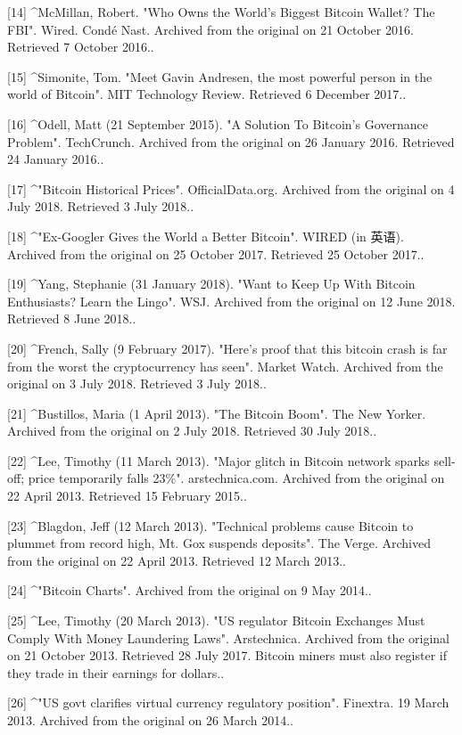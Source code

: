 [14]
^McMillan, Robert. "Who Owns the World's Biggest Bitcoin Wallet? The FBI". Wired. Condé Nast. Archived from the original on 21 October 2016. Retrieved 7 October 2016..

[15]
^Simonite, Tom. "Meet Gavin Andresen, the most powerful person in the world of Bitcoin". MIT Technology Review. Retrieved 6 December 2017..

[16]
^Odell, Matt (21 September 2015). "A Solution To Bitcoin's Governance Problem". TechCrunch. Archived from the original on 26 January 2016. Retrieved 24 January 2016..

[17]
^"Bitcoin Historical Prices". OfficialData.org. Archived from the original on 4 July 2018. Retrieved 3 July 2018..

[18]
^"Ex-Googler Gives the World a Better Bitcoin". WIRED (in 英语). Archived from the original on 25 October 2017. Retrieved 25 October 2017..

[19]
^Yang, Stephanie (31 January 2018). "Want to Keep Up With Bitcoin Enthusiasts? Learn the Lingo". WSJ. Archived from the original on 12 June 2018. Retrieved 8 June 2018..

[20]
^French, Sally (9 February 2017). "Here's proof that this bitcoin crash is far from the worst the cryptocurrency has seen". Market Watch. Archived from the original on 3 July 2018. Retrieved 3 July 2018..

[21]
^Bustillos, Maria (1 April 2013). "The Bitcoin Boom". The New Yorker. Archived from the original on 2 July 2018. Retrieved 30 July 2018..

[22]
^Lee, Timothy (11 March 2013). "Major glitch in Bitcoin network sparks sell-off; price temporarily falls 23\%". arstechnica.com. Archived from the original on 22 April 2013. Retrieved 15 February 2015..

[23]
^Blagdon, Jeff (12 March 2013). "Technical problems cause Bitcoin to plummet from record high, Mt. Gox suspends deposits". The Verge. Archived from the original on 22 April 2013. Retrieved 12 March 2013..

[24]
^"Bitcoin Charts". Archived from the original on 9 May 2014..

[25]
^Lee, Timothy (20 March 2013). "US regulator Bitcoin Exchanges Must Comply With Money Laundering Laws". Arstechnica. Archived from the original on 21 October 2013. Retrieved 28 July 2017. Bitcoin miners must also register if they trade in their earnings for dollars..

[26]
^"US govt clarifies virtual currency regulatory position". Finextra. 19 March 2013. Archived from the original on 26 March 2014..

